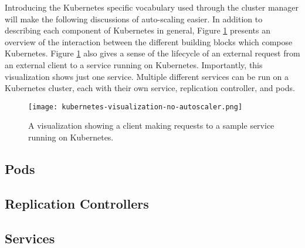 Introducing the Kubernetes specific vocabulary used through the cluster manager
will make the following discussions of auto-scaling easier. In addition to
describing each component of Kubernetes in general, Figure
\ref{fig:kubernetes-visualization-no-autoscaler} presents an overview of the
interaction between the different building blocks which compose Kubernetes.
Figure \ref{fig:kubernetes-visualization-no-autoscaler} also gives a sense of
the lifecycle of an external request from an external client
to a service running on Kubernetes.
Importantly, this visualization shows just one service. Multiple different
services can be run on a Kubernetes cluster, each with their own service,
replication controller, and pods.

\begin{figure}[!h]
  \centerline{\texttt{[image: kubernetes-visualization-no-autoscaler.png]}}
  \caption{A visualization showing a client making requests to a
  sample service running on Kubernetes.}
  \label{fig:kubernetes-visualization-no-autoscaler}
\end{figure}

\subsection{Pods}



\subsection{Replication Controllers}



\subsection{Services}


